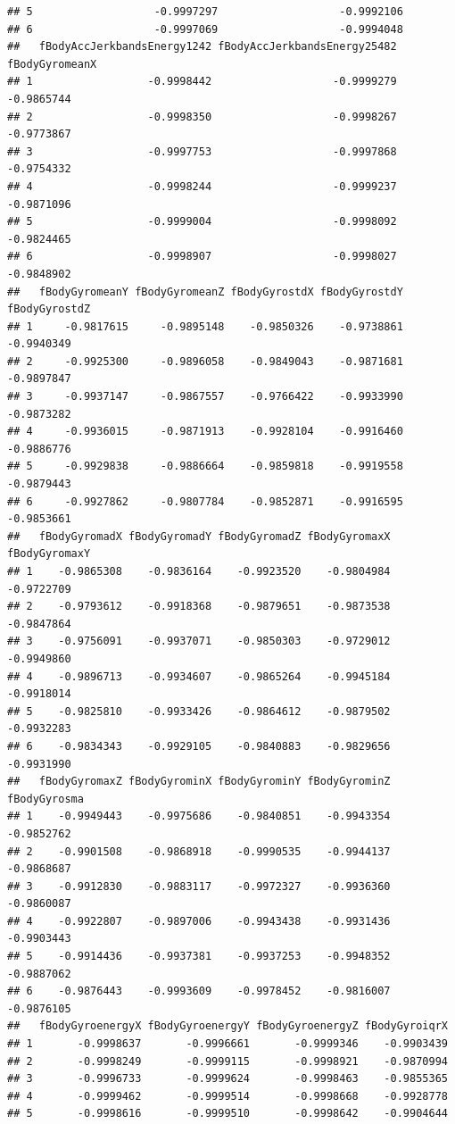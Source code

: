 \documentclass[
]{article}
\begin{document}
\begin{verbatim}
## 5                   -0.9997297                   -0.9992106
## 6                   -0.9997069                   -0.9994048
##   fBodyAccJerkbandsEnergy1242 fBodyAccJerkbandsEnergy25482 fBodyGyromeanX
## 1                  -0.9998442                   -0.9999279     -0.9865744
## 2                  -0.9998350                   -0.9998267     -0.9773867
## 3                  -0.9997753                   -0.9997868     -0.9754332
## 4                  -0.9998244                   -0.9999237     -0.9871096
## 5                  -0.9999004                   -0.9998092     -0.9824465
## 6                  -0.9998907                   -0.9998027     -0.9848902
##   fBodyGyromeanY fBodyGyromeanZ fBodyGyrostdX fBodyGyrostdY fBodyGyrostdZ
## 1     -0.9817615     -0.9895148    -0.9850326    -0.9738861    -0.9940349
## 2     -0.9925300     -0.9896058    -0.9849043    -0.9871681    -0.9897847
## 3     -0.9937147     -0.9867557    -0.9766422    -0.9933990    -0.9873282
## 4     -0.9936015     -0.9871913    -0.9928104    -0.9916460    -0.9886776
## 5     -0.9929838     -0.9886664    -0.9859818    -0.9919558    -0.9879443
## 6     -0.9927862     -0.9807784    -0.9852871    -0.9916595    -0.9853661
##   fBodyGyromadX fBodyGyromadY fBodyGyromadZ fBodyGyromaxX fBodyGyromaxY
## 1    -0.9865308    -0.9836164    -0.9923520    -0.9804984    -0.9722709
## 2    -0.9793612    -0.9918368    -0.9879651    -0.9873538    -0.9847864
## 3    -0.9756091    -0.9937071    -0.9850303    -0.9729012    -0.9949860
## 4    -0.9896713    -0.9934607    -0.9865264    -0.9945184    -0.9918014
## 5    -0.9825810    -0.9933426    -0.9864612    -0.9879502    -0.9932283
## 6    -0.9834343    -0.9929105    -0.9840883    -0.9829656    -0.9931990
##   fBodyGyromaxZ fBodyGyrominX fBodyGyrominY fBodyGyrominZ fBodyGyrosma
## 1    -0.9949443    -0.9975686    -0.9840851    -0.9943354   -0.9852762
## 2    -0.9901508    -0.9868918    -0.9990535    -0.9944137   -0.9868687
## 3    -0.9912830    -0.9883117    -0.9972327    -0.9936360   -0.9860087
## 4    -0.9922807    -0.9897006    -0.9943438    -0.9931436   -0.9903443
## 5    -0.9914436    -0.9937381    -0.9937253    -0.9948352   -0.9887062
## 6    -0.9876443    -0.9993609    -0.9978452    -0.9816007   -0.9876105
##   fBodyGyroenergyX fBodyGyroenergyY fBodyGyroenergyZ fBodyGyroiqrX
## 1       -0.9998637       -0.9996661       -0.9999346    -0.9903439
## 2       -0.9998249       -0.9999115       -0.9998921    -0.9870994
## 3       -0.9996733       -0.9999624       -0.9998463    -0.9855365
## 4       -0.9999462       -0.9999514       -0.9998668    -0.9928778
## 5       -0.9998616       -0.9999510       -0.9998642    -0.9904644

\end{verbatim}
\end{document}
